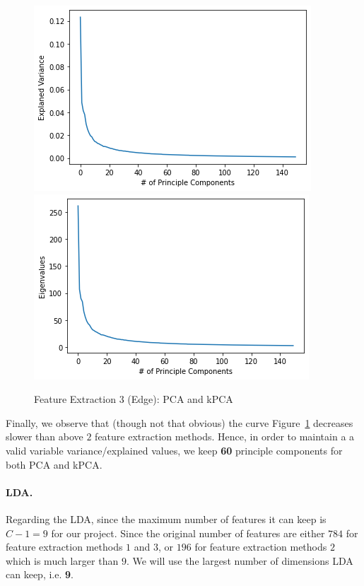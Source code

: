 \documentclass{article}
\begin{document}
\begin{figure}[!htb]
  \includegraphics[width=\linewidth]{figure/pca_edge.png}
\endminipage\hfill
{}
  \includegraphics[width=\linewidth]{figure/kpca_edge.png}
\endminipage
\caption{Feature Extraction 3 (Edge): PCA and kPCA}
\label{feature3}
\end{figure}

Finally, we observe that (though not that obvious) the curve Figure~\ref{feature3} decreases slower than above $2$ feature extraction methods. Hence, in order to maintain a a valid variable variance/explained values, we keep \textbf{60} principle components for both PCA and kPCA.

\paragraph{LDA.}
Regarding the LDA, since the maximum number of features it can keep is $C-1 = 9$ for our project. Since the original number of features are either $784$ for feature extraction methods $1$ and $3$, or $196$ for feature extraction methods $2$ which is much larger than $9$. We will use the largest number of dimensions LDA can keep, i.e. \textbf{9}.
\end{document}

